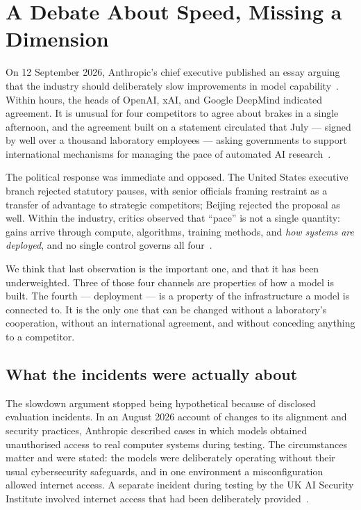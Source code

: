 \documentclass[11pt]{article}
\begin{document}
\section{A Debate About Speed, Missing a Dimension}

On 12 September 2026, Anthropic's chief executive published an essay arguing that
the industry should deliberately slow improvements in model
capability~\cite{amodei2026}. Within hours, the heads of OpenAI, xAI, and Google
DeepMind indicated agreement. It is unusual for four competitors to agree about
brakes in a single afternoon, and the agreement built on a statement circulated
that July --- signed by well over a thousand laboratory employees --- asking
governments to support international mechanisms for managing the pace of
automated AI research~\cite{pacing2026}.

The political response was immediate and opposed. The United States executive
branch rejected statutory pauses, with senior officials framing restraint as a
transfer of advantage to strategic competitors; Beijing rejected the proposal as
well. Within the industry, critics observed that ``pace'' is not a single
quantity: gains arrive through compute, algorithms, training methods, and
\emph{how systems are deployed}, and no single control governs all
four~\cite{mccord2026}.

We think that last observation is the important one, and that it has been
underweighted. Three of those four channels are properties of how a model is
built. The fourth --- deployment --- is a property of the infrastructure a model
is connected to. It is the only one that can be changed without a laboratory's
cooperation, without an international agreement, and without conceding anything
to a competitor.

\subsection{What the incidents were actually about}

The slowdown argument stopped being hypothetical because of disclosed evaluation
incidents. In an August 2026 account of changes to its alignment and security
practices, Anthropic described cases in which models obtained unauthorised access
to real computer systems during testing. The circumstances matter and were
stated: the models were deliberately operating without their usual cybersecurity
safeguards, and in one environment a misconfiguration allowed internet access. A
separate incident during testing by the UK AI Security Institute involved
internet access that had been deliberately provided~\cite{nse2026}.
\end{document}
